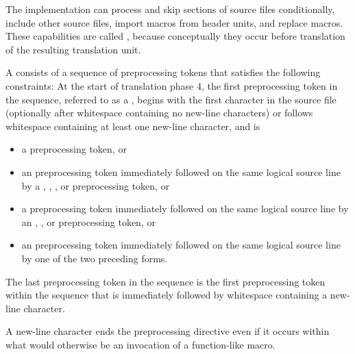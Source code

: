 \begin{bnf}
\br
\end{bnf}

\pnum
The implementation can
process and skip sections of source files conditionally,
include other source files,
import macros from header units,
and replace macros.
These capabilities are called
,
because conceptually they occur
before translation of the resulting translation unit.

\pnum
A  consists of a sequence of preprocessing tokens
that satisfies the following constraints:
At the start of translation phase 4,
the first preprocessing token in the sequence,
referred to as a ,
begins with the first character in the source file
(optionally after whitespace containing no new-line characters) or
follows whitespace containing at least one new-line character,
and is

\begin{itemize}
\item
a \tcode{\#} preprocessing token, or

\item
an  preprocessing token
immediately followed on the same logical source line by a
,
\tcode{<},
, or
\tcode{:}
preprocessing token, or

\item
a  preprocessing token
immediately followed on the same logical source line by an
,
\tcode{:}, or
\tcode{;}
preprocessing token, or

\item
an  preprocessing token
immediately followed on the same logical source line by
one of the two preceding forms.
\end{itemize}

The last preprocessing token in the sequence is the first preprocessing token within the sequence that
is immediately followed by whitespace containing a new-line character.
\begin{note}
A new-line character ends the preprocessing directive even if it occurs
within what would otherwise be an invocation of a function-like macro.
\end{note}

